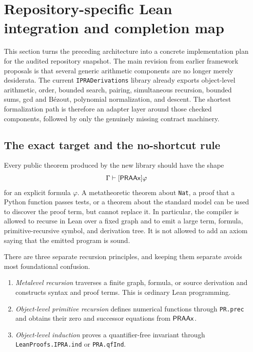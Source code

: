 \section{Repository-specific Lean integration and completion map}
\label{sec:repo-integration}

This section turns the preceding architecture into a concrete implementation plan for the audited repository snapshot.  The main revision from earlier framework proposals is that several generic arithmetic components are no longer merely desiderata.  The current \texttt{IPRADerivations} library already exports object-level arithmetic, order, bounded search, pairing, simultaneous recursion, bounded sums, gcd and B\'ezout, polynomial normalization, and descent.  The shortest formalization path is therefore an adapter layer around those checked components, followed by only the genuinely missing contract machinery.

\subsection{The exact target and the no-shortcut rule}

Every public theorem produced by the new library should have the shape
\[
  \Gamma\vdash[\mathsf{PRAAx}]\varphi
\]
for an explicit formula \(\varphi\).  A metatheoretic theorem about \texttt{Nat}, a proof that a Python function passes tests, or a theorem about the standard model can be used to discover the proof term, but cannot replace it.  In particular, the compiler is allowed to recurse in Lean over a fixed graph and to emit a large term, formula, primitive-recursive symbol, and derivation tree.  It is not allowed to add an axiom saying that the emitted program is sound.

There are three separate recursion principles, and keeping them separate avoids most foundational confusion.

\begin{enumerate}[label=(\arabic*)]
\item \emph{Metalevel recursion} traverses a finite graph, formula, or source derivation and constructs syntax and proof terms.  This is ordinary Lean programming.
\item \emph{Object-level primitive recursion} defines numerical functions through \texttt{PR.prec} and obtains their zero and successor equations from \(\mathsf{PRAAx}\).
\item \emph{Object-level induction} proves a quantifier-free invariant through \texttt{LeanProofs.IPRA.ind} or \texttt{PRA.qfInd}.
\end{enumerate}

